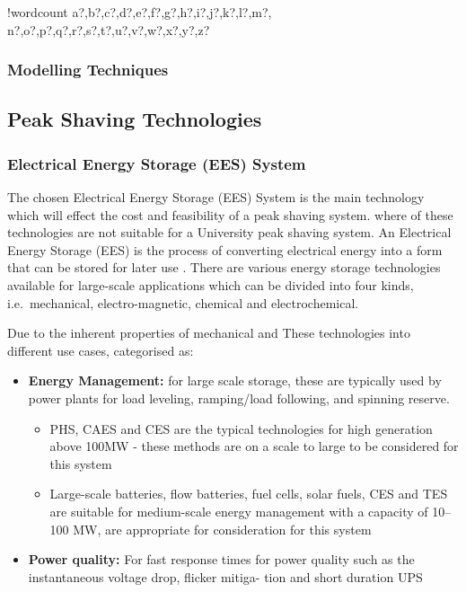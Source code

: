 \documentclass[10pt]{article}
\providecommand{\tightlist}{%
  \setlength{\itemsep}{0pt}\setlength{\parskip}{0pt}}
\newcounter{words}
\newenvironment{counted}{%
  \setcounter{words}{0}
  \SearchList!{wordcount}{\stepcounter{words}}
    {a?,b?,c?,d?,e?,f?,g?,h?,i?,j?,k?,l?,m?,
    n?,o?,p?,q?,r?,s?,t?,u?,v?,w?,x?,y?,z?}
  \UndoBoundary{'}
  \SearchOrder{p;}}{%
  \StopSearching}
\begin{document}
\begin{counted}
\subsubsection{Modelling Techniques}\label{modelling-techniques}

\subsection{Peak Shaving Technologies}\label{peak-shaving-technologies}

\subsubsection{Electrical Energy Storage (EES)
System}\label{electrical-energy-storage-ees-system}

The chosen Electrical Energy Storage (EES) System is the main technology
which will effect the cost and feasibility of a peak shaving system.
where of these technologies are not suitable for a University peak
shaving system. An Electrical Energy Storage (EES) is the process of
converting electrical energy into a form that can be stored for later
use \cite{Chen2009291}. There are various energy storage technologies
available for large-scale applications which can be divided into four
kinds, i.e.~mechanical, electro-magnetic, chemical and electrochemical.

Due to the inherent properties of mechanical and These technologies into
different use cases, categorised as:

\begin{itemize}
\tightlist
\item
  \textbf{Energy Management:} for large scale storage, these are
  typically used by power plants for load leveling, ramping/load
  following, and spinning reserve.

  \begin{itemize}
  \tightlist
  \item
    PHS, CAES and CES are the typical technologies for high generation
    above 100MW - these methods are on a scale to large to be considered
    for this system
  \item
    Large-scale batteries, flow batteries, fuel cells, solar fuels, CES
    and TES are suitable for medium-scale energy management with a
    capacity of 10--100 MW, are appropriate for consideration for this
    system
  \end{itemize}
\item
  \textbf{Power quality:} For fast response times for power quality such
  as the instantaneous voltage drop, flicker mitiga- tion and short
  duration UPS


\end{itemize}
\end{counted}
\end{document}
